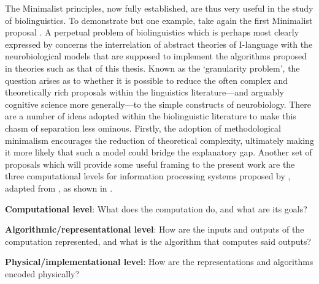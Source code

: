The Minimalist principles, now fully established, are thus very useful in the study of biolinguistics. To demonstrate but one example, take again the first Minimalist proposal . A perpetual problem of biolinguistics which is perhaps most clearly expressed by \textcite{PoeppelD.EmbickD_2005,EmbickD.PoeppelD_2015} concerns the interrelation of abstract theories of I-language with the neurobiological models that are supposed to implement the algorithms proposed in theories such as that of this thesis. Known as the `granularity problem', the question arises as to whether it is possible to reduce the often complex and theoretically rich proposals within the linguistics literature---and arguably cognitive science more generally---to the simple constructs of neurobiology. There are a number of ideas adopted within the biolinguistic literature to make this chasm of separation less ominous. Firstly, the adoption of methodological minimalism encourages the reduction of theoretical complexity, ultimately making it more likely that such a model could bridge the explanatory gap. Another set of proposals which will provide some useful framing to the present work are the three computational levels for information processing systems proposed by \textcite[25]{MarrD_1982}, adapted from \textcite{MarrD.PoggioT_1976}, as shown in .

\begin{subexamples}\label{ex:marr}
    \item\label{ex:marr:1} \textbf{Computational level}: What does the computation do, and what are its goals?
    \item\label{ex:marr:2} \textbf{Algorithmic/representational level}: How are the inputs and outputs of the computation represented, and what is the algorithm that computes said outputs? 
    \item\label{ex:marr:3} \textbf{Physical/implementational level}: How are the representations and algorithms encoded physically?
\end{subexamples}


